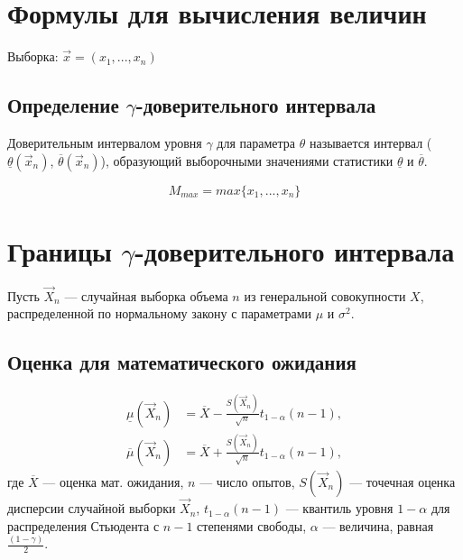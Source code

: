 \section{Формулы для вычисления величин}
Выборка:  $\vec{x} = (x_1, ..., x_n) $

\subsection{Определение $\gamma$-доверительного интервала}
Доверительным интервалом уровня $\gamma$ для параметра $\theta$ называется интервал ($\underline\theta(\vec x_n)$, $\overline\theta(\vec x_n)$), образующий выборочными значениями статистики $\underline\theta$ и $\overline\theta$.


\begin{equation*}
	M_{max} = max\{x_1, ..., x_n\}
\end{equation*}




\section{Границы $\gamma$-доверительного интервала}

Пусть $\vec X_n$ — случайная выборка объема $n$ из генеральной совокупности $X$, распределенной по нормальному закону с параметрами $\mu$ и $\sigma^{2}$.

\subsection{Оценка для математического ожидания}

\begin{align}
	\underline\mu(\vec X_n) &= \overline X -\frac{S(\vec X_n)}{\sqrt n}t_{1-\alpha}(n-1),\\
	\overline\mu(\vec X_n)  &= \overline X +\frac{S(\vec X_n)}{\sqrt n}t_{1-\alpha}(n-1),
\end{align}
где $\overline X$ — оценка мат. ожидания, $n$ — число опытов, $S(\vec X_n)$ — точечная оценка дисперсии случайной выборки $\vec X_n$, $t_{1-\alpha}(n-1)$ — квантиль уровня $1-\alpha$ для распределения Стьюдента с $n-1$ степенями свободы, $\alpha$ — величина, равная $\displaystyle \frac{(1-\gamma)}2$.






